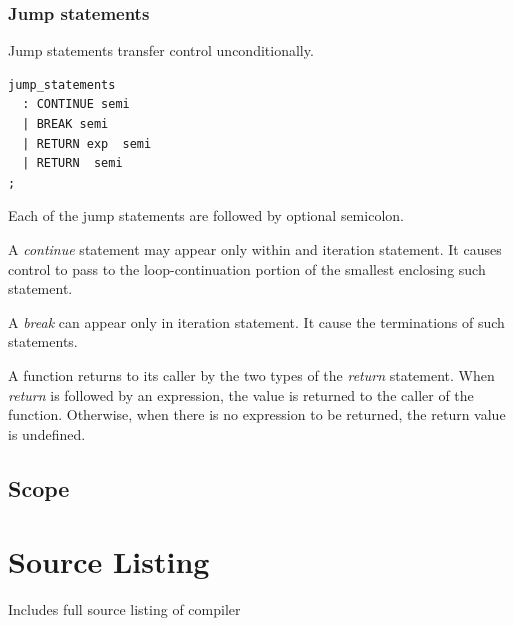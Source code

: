 \documentclass{l3proj}
\begin{document}
\subsection{Jump statements} 
Jump statements transfer control unconditionally. 
\begin{lstlisting}
jump_statements 
  : CONTINUE semi
  | BREAK semi 
  | RETURN exp  semi 
  | RETURN  semi 
;
\end{lstlisting}
Each of the jump statements are followed by optional semicolon. 

A \textit{continue} statement may appear only within and iteration statement. It causes control to pass to the loop-continuation portion of the smallest enclosing such statement.

A \textit{break} can appear only in iteration statement. It cause the terminations of such statements. 

A function returns to its caller by the two types of the \textit{return} statement. When \textit{return} is followed by an expression, the value is returned to the caller of the function. Otherwise, when there is no expression to be returned, the return value is undefined. 

\section{Scope}

\chapter{Source Listing}
\label{appa}

Includes full source listing of compiler




\end{document}
